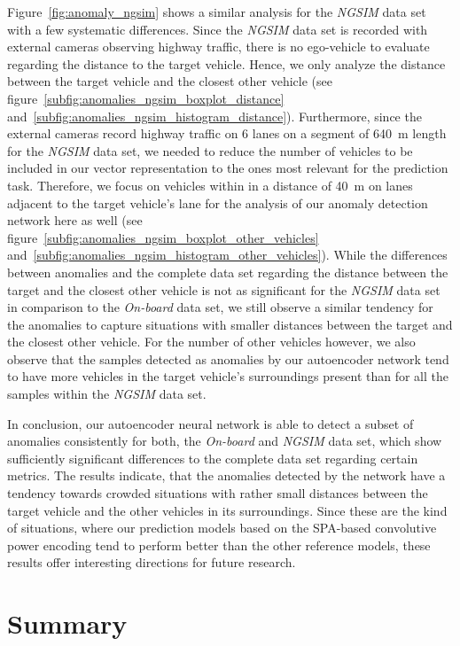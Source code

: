 Figure~\ref{fig:anomaly_ngsim} shows a similar analysis for the \emph{\ac{NGSIM}} data set with a few systematic differences.
Since the \emph{\ac{NGSIM}} data set is recorded with external cameras observing highway traffic, there is no ego-vehicle to evaluate regarding the distance to the target vehicle.
Hence, we only analyze the distance between the target vehicle and the closest other vehicle (see figure~\ref{subfig:anomalies_ngsim_boxplot_distance} and~\ref{subfig:anomalies_ngsim_histogram_distance}).
Furthermore, since the external cameras record highway traffic on \num{6} lanes on a segment of \SI{640}{\meter} length for the \emph{\ac{NGSIM}} data set, we needed to reduce the number of vehicles to be included in our vector representation to the ones most relevant for the prediction task.
Therefore, we focus on vehicles within in a distance of \SI{40}{\meter} on lanes adjacent to the target vehicle's lane for the analysis of our anomaly detection network here as well (see figure~\ref{subfig:anomalies_ngsim_boxplot_other_vehicles} and~\ref{subfig:anomalies_ngsim_histogram_other_vehicles}).
While the differences between anomalies and the complete data set regarding the distance between the target and the closest other vehicle is not as significant for the \emph{\ac{NGSIM}} data set in comparison to the \emph{On-board} data set, we still observe a similar tendency for the anomalies to capture situations with smaller distances between the target and the closest other vehicle.
For the number of other vehicles however, we also observe that the samples detected as anomalies by our autoencoder network tend to have more vehicles in the target vehicle's surroundings present than for all the samples within the \emph{\ac{NGSIM}} data set.

In conclusion, our autoencoder neural network is able to detect a subset of anomalies consistently for both, the \emph{On-board} and \emph{\ac{NGSIM}} data set, which show sufficiently significant differences to the complete data set regarding certain metrics.
The results indicate, that the anomalies detected by the network have a tendency towards crowded situations with rather small distances between the target vehicle and the other vehicles in its surroundings.
Since these are the kind of situations, where our prediction models based on the \ac{SPA}-based convolutive power encoding tend to perform better than the other reference models, these results offer interesting directions for future research.

\section{Summary}%
\label{sec:summary_behavior_prediction}

